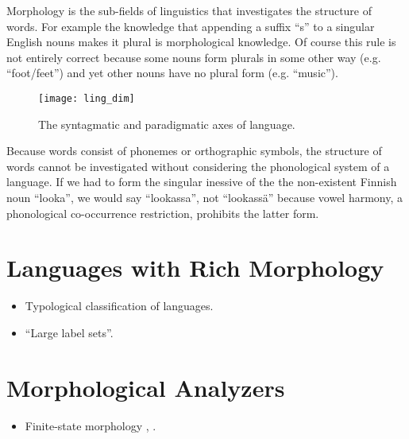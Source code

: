 Morphology is the sub-fields of linguistics that investigates the
structure of words. For example the knowledge that appending a suffix
``s'' to a singular English nouns makes it plural is morphological
knowledge. Of course this rule is not entirely correct because some
nouns form plurals in some other way (e.g. ``foot/feet'') and yet
other nouns have no plural form (e.g. ``music'').

\begin{figure}
\begin{center}
\caption{The syntagmatic and paradigmatic axes of language.}\label{fig:lingdim}
\texttt{[image: ling\_dim]}
\end{center}
\end{figure}

Because words consist of phonemes or orthographic symbols, the
structure of words cannot be investigated without considering the
phonological system of a language. If we had to form the singular
inessive of the the non-existent Finnish noun ``looka'', we would say
``lookassa'', not ``lookassä'' because vowel harmony, a phonological
co-occurrence restriction, prohibits the latter form.


\section{Languages with Rich Morphology}
\begin{itemize}
\item Typological classification of languages.
\item ``Large label sets''.
\end{itemize}

\section{Morphological Analyzers}
\begin{itemize}
\item Finite-state morphology \citep{Koskenniemi1984}, \citep{Kaplan1994}.
\end{itemize}
